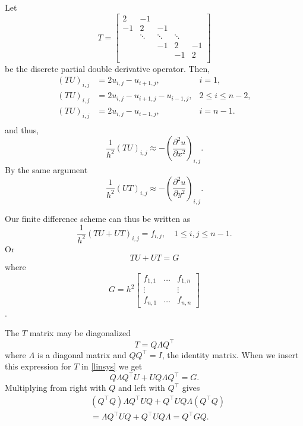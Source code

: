 \documentclass{article}
\newcommand{\dd}[2]{\ensuremath{\frac{\partial^2 #1}{\partial #2^2}}}
\begin{document}
Let 
\begin{equation}
       T = \begin{bmatrix}
               2 & -1 & & & \\
               -1 & 2 & -1 & & \\
               & \ddots & \ddots & \ddots &\\
               & & -1 & 2 & -1\\
               & & & -1 & 2 \\
       \end{bmatrix}
\end{equation}
be the discrete partial double derivative operator.
Then,
\begin{align*}
       (TU)_{i,j} &= 2u_{i,j} - u_{i+1,j}, &i=1,\\
       (TU)_{i,j} &= 2u_{i,j} - u_{i+1,j} - u_{i-1,j}, &2 \leq i \leq n-2,\\
       (TU)_{i,j} &= 2u_{i,j} - u_{i-1,j}, &i=n-1.\\
\end{align*}
and thus,
\[
\frac{1}{h^2}(TU)_{i,j} \approx - \left( \dd{u}{x} \right)_{i,j}.
\]
By the same argument
\[
\frac{1}{h^2}(UT)_{i,j} \approx - \left(\dd{u}{y}\right)_{i,j}.
\]

Our finite difference scheme can thus be written as
\[
\frac{1}{h^2}(TU + UT)_{i,j} = f_{i,j}, \quad 1\leq i,j \leq n-1.
\]
Or
\[
\label{linsys}
TU + UT = G
\]
where
\begin{equation}
G = h^2 \begin{bmatrix}
               f_{1,1} & \dots & f_{1,n} \\
               \vdots  &       & \vdots \\
               f_{n,1} & \dots & f_{n,n}
       \end{bmatrix}
\end{equation}.

The $T$ matrix may be diagonalized
\[
T = Q \Lambda Q^\top
\]
where $\Lambda$ is a diagonal matrix and $Q Q^\top=I$, the identity matrix.
When we insert this expression for $T$ in \eqref{linsys} we get
\[
Q \Lambda Q^\top U + U Q \Lambda Q^\top = G.
\]
Multiplying from right with $Q$ and left with $Q^\top$ gives
\begin{align*}
&(Q^\top Q) \Lambda Q^\top U Q + Q^\top U Q \Lambda (Q^\top Q)\\
&= \Lambda Q^\top U Q + Q^\top U Q \Lambda = Q^\top G Q.
\end{align*}
\end{document}
